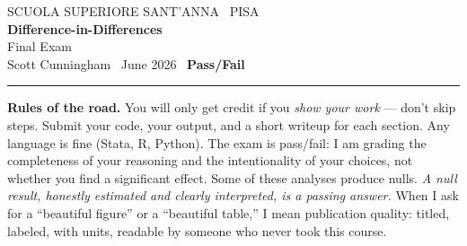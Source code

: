 \documentclass[11pt,a4paper]{article}
\begin{document}
\begin{center}
{\color{OldMortar}\small SCUOLA SUPERIORE SANT'ANNA \textperiodcentered\ PISA}\\[0.5em]
{\Huge\bfseries\color{ArnoBlue} Difference-in-Differences}\\[0.35em]
{\Large\color{Terracotta} Final Exam}\\[0.8em]
{\color{PisaStone} Scott Cunningham \textperiodcentered\ June 2026 \textperiodcentered\ \textbf{Pass/Fail}}\\[0.4em]
{\color{Terracotta}\rule{0.55\textwidth}{1.1pt}}
\end{center}

\vspace{0.6em}

\noindent\textbf{Rules of the road.} You will only get credit if you \emph{show your work} --- don't skip steps. Submit your code, your output, and a short writeup for each section. Any language is fine (Stata, R, Python). The exam is pass/fail: I am grading the completeness of your reasoning and the intentionality of your choices, not whether you find a significant effect. Some of these analyses produce nulls. \emph{A null result, honestly estimated and clearly interpreted, is a passing answer.} When I ask for a ``beautiful figure'' or a ``beautiful table,'' I mean publication quality: titled, labeled, with units, readable by someone who never took this course.
\end{document}
